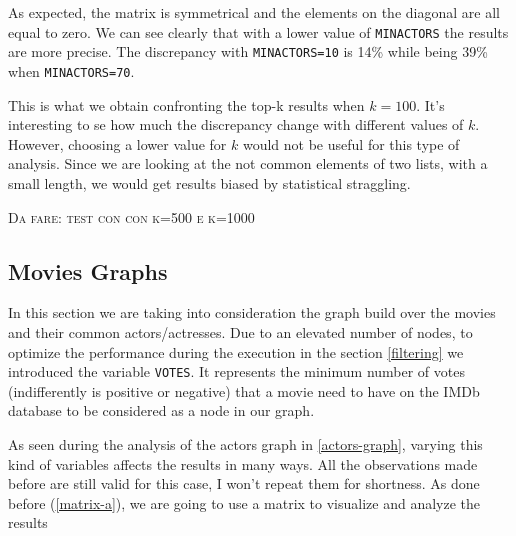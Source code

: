 \nd As expected, the matrix is symmetrical and the elements on the diagonal are all equal to zero. We can see clearly that with a lower value of \texttt{MIN\textunderscore ACTORS} the results are more precise. The discrepancy with \texttt{MIN\textunderscore ACTORS=10} is 14\% while being 39\% when \texttt{MIN\textunderscore ACTORS=70}. \s

\nd This is what we obtain confronting the top-k results when $k=100$. It's interesting to se how much the discrepancy change with different values of $k$. However, choosing a lower value for $k$ would not be useful for this type of analysis. Since we are looking at the not common elements of two lists, with a small length, we would get results biased by statistical straggling. \s

\textsc{Da fare: test con con k=500 e k=1000}

\s
\newpage
\subsection{Movies Graphs}
In this section we are taking into consideration the graph build over the movies and their common actors/actresses. Due to an elevated number of nodes, to optimize the performance during the execution in the section \ref{filtering} we introduced the variable \texttt{VOTES}. It represents the minimum number of votes (indifferently is positive or negative) that a movie need to have on the IMDb database to be considered as a node in our graph.

As seen during the analysis of the actors graph in \ref{actors-graph}, varying this kind of variables affects the results in many ways. All the observations made before are still valid for this case, I won't repeat them for shortness. As done before (\ref{matrix-a}), we are going to use a matrix to visualize and analyze the results
\s

% 

